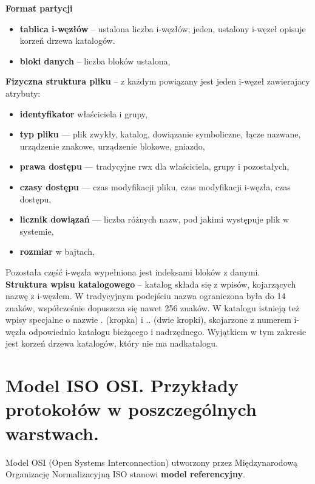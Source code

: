 \documentclass[main.tex]{subfiles}
\begin{document}
    \noindent \textbf{Format partycji}
    \begin{itemize}[noitemsep]
        \item \textbf{tablica i-węzłów} -- ustalona liczba i-węzłów; jeden, ustalony i-węzeł opisuje korzeń drzewa katalogów.
        \item \textbf{bloki danych} -- liczba bloków ustalona,
    \end{itemize}


    \noindent \textbf{Fizyczna struktura pliku} -- z każdym powiązany jest jeden i-węzeł zawierajacy atrybuty:
    \begin{itemize}[noitemsep]
        \item \textbf{identyfikator} właściciela i grupy,
        \item \textbf{typ pliku} — plik zwykły, katalog, dowiązanie symboliczne, łącze nazwane, urządzenie znakowe,
        urządzenie blokowe, gniazdo,
        \item \textbf{prawa dostępu} — tradycyjne rwx dla właściciela, grupy i pozostałych,
        \item \textbf{czasy dostępu} — czas modyfikacji pliku, czas modyfikacji i-węzła, czas dostępu,
        \item \textbf{licznik dowiązań} — liczba różnych nazw, pod jakimi występuje plik w systemie,
        \item \textbf{rozmiar} w bajtach,
    \end{itemize}
    Pozostała część i-węzła wypełniona jest indeksami bloków z danymi.\\

    \noindent \textbf{Struktura wpisu katalogowego} -- katalog składa się z wpisów, kojarzących nazwę z i-węzłem.
    W tradycyjnym podejściu nazwa ograniczona była do 14 znaków, współcześnie dopuszcza się nawet 256 znaków.
    W katalogu istnieją też wpisy specjalne o nazwie . (kropka) i .. (dwie kropki), skojarzone z numerem i-węzła
    odpowiednio katalogu bieżącego i nadrzędnego. Wyjątkiem w tym zakresie jest korzeń drzewa
    katalogów, który nie ma nadkatalogu.


    \section{Model ISO OSI. Przykłady protokołów w poszczególnych warstwach.}
    Model OSI (Open Systems Interconnection) utworzony przez Międzynarodową Organizację Normalizacyjną ISO stanowi
    \textbf{model referencyjny}.
\end{document}
